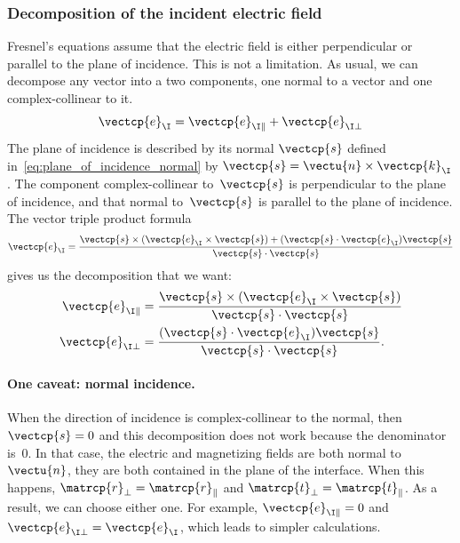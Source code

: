 \begin{refsection}
\subsubsection{Decomposition of the incident electric field}
\label{sec:decomposition_para_perp}
Fresnel's equations assume that the electric field is either perpendicular or parallel to the plane of incidence.
This is not a limitation.
As usual, we can decompose any vector into a two components, one normal to a vector and one complex-collinear to it.
\begin{equation}
    \vectcp{e}_\I = \vectcp{e}_{\I \parallel} + \vectcp{e}_{\I \perp}
\end{equation}
The plane of incidence is described by its normal $\vectcp{s}$ defined in~\cref{eq:plane_of_incidence_normal} by $\vectcp{s} = \vectu{n} \times \vectcp{k}_\I$.
The component complex-collinear to~$\vectcp{s}$ is perpendicular to the plane of incidence, and that normal to~$\vectcp{s}$ is parallel to the plane of incidence.
The vector triple product formula
\begin{equation}
    \vectcp{e}_\I =
    \frac{
        \vectcp{s} \times (\vectcp{e}_\I \times \vectcp{s})
        +
        (\vectcp{s} \cdot \vectcp{e}_\I) \vectcp{s}
    }{
        \vectcp{s} \cdot \vectcp{s}
    }
\end{equation}
gives us the decomposition that we want:
\begin{subequations}    
    \begin{align}
        \vectcp{e}_{\I \parallel}
        &=
        \frac{
            \vectcp{s} \times (\vectcp{e}_\I \times \vectcp{s})
        }{
            \vectcp{s} \cdot \vectcp{s}
        }
        \\
        \vectcp{e}_{\I \perp}
        &=
        \frac{
            (\vectcp{s} \cdot \vectcp{e}_\I) \vectcp{s}
        }{
            \vectcp{s} \cdot \vectcp{s}
        }
        \text{.}
    \end{align}
\end{subequations}

\paragraph{One caveat: normal incidence.}
\label{sec:fresnel_normal_incidence}
When the direction of incidence is complex-collinear to the normal, then 
$\vectcp{s}=0$ and this decomposition does not work because the denominator is~0.
In that case, the electric and magnetizing fields are both normal to~$\vectu{n}$, they are both contained in the plane of the interface.
When this happens, $\matrcp{r}_\perp = \matrcp{r}_\parallel$ and $\matrcp{t}_\perp = \matrcp{t}_\parallel$.
As a result, we can choose either one.
For example, $\vectcp{e}_{\I \parallel} = 0$ and $\vectcp{e}_{\I \perp}=\vectcp{e}_\I$, which leads to simpler calculations.


\end{refsection}
